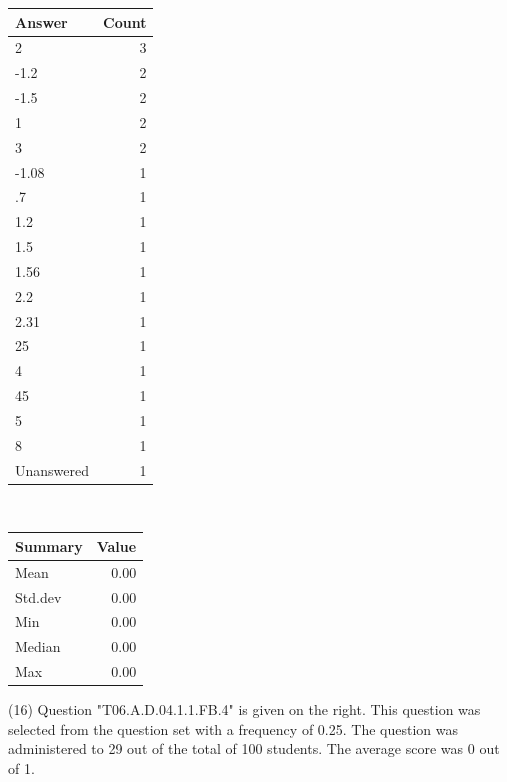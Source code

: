 \documentclass[12pt,nohyper]{tufte-handout}\usepackage[]{graphicx}\usepackage[]{color}
\begin{document}
\begin{center}%
\begin{tabular}{lr}
  \hline
Answer & Count \\ 
  \hline
2 &   3 \\ 
  -1.2 &   2 \\ 
  -1.5 &   2 \\ 
  1 &   2 \\ 
  3 &   2 \\ 
  -1.08 &   1 \\ 
  .7 &   1 \\ 
  1.2 &   1 \\ 
  1.5 &   1 \\ 
  1.56 &   1 \\ 
  2.2 &   1 \\ 
  2.31 &   1 \\ 
  25 &   1 \\ 
  4 &   1 \\ 
  45 &   1 \\ 
  5 &   1 \\ 
  8 &   1 \\ 
  Unanswered &   1 \\ 
   \hline
\end{tabular}
~~~~~~~~%
\begin{tabular}{lr}
  \hline
Summary & Value \\ 
  \hline
Mean & 0.00 \\ 
  Std.dev & 0.00 \\ 
  Min & 0.00 \\ 
  Median & 0.00 \\ 
  Max & 0.00 \\ 
   \hline
\end{tabular}
\end{center}\newpage{} (16) Question "T06.A.D.04.1.1.FB.4" is given on the right. This question was selected from the question set with a frequency of 0.25. The question was administered to 29 out of the total of 100 students. The average score was 0 out of 1.
\end{document}

